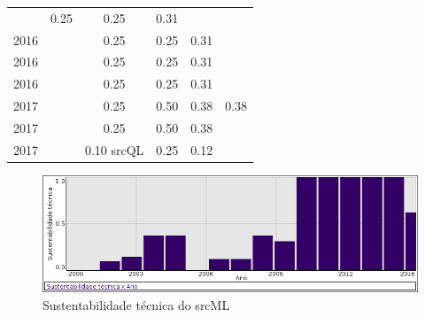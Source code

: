 \begin{table}[H]
\begin{tabular}{| l | c | c | c | c | c |}
          &
          0.25
          &
          0.25
          &
          0.31
          &
          \\
            2016
          &
          
          &
          0.25
          &
          0.25
          &
          0.31
          &
          \\
            2016
          &
          
          &
          0.25
          &
          0.25
          &
          0.31
          &
          \\
            2016
          &
          
          &
          0.25
          &
          0.25
          &
          0.31
          &
          \\
\hline
            2017
          &
          
          &
          0.25
          &
          0.50
          &
          0.38
          &
            {\color{red} 0.38}
          \\
            2017
          &
          
          &
          0.25
          &
          0.50
          &
          0.38
          &
          \\
            2017
          &
          
          &
          0.10
            {\tiny srcQL}
          &
          0.25
          &
          0.12
          &
          \\
\hline
\end{tabular}
\end{table}

\begin{figure}[h]
  \center
  \includegraphics[scale=0.50]{imagens/softwares-charts/srcml.png}
  \caption{Sustentabilidade técnica do srcML}
\end{figure}


